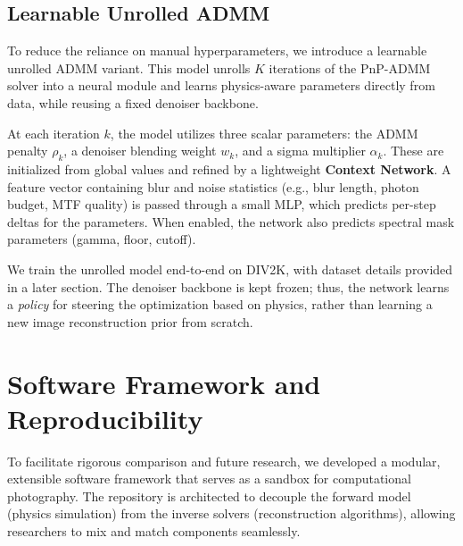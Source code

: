 \documentclass[10pt,journal,compsoc]{IEEEtran}
\begin{document}
\subsection{Learnable Unrolled ADMM}
To reduce the reliance on manual hyperparameters, we introduce a learnable unrolled ADMM variant. This model unrolls $K$ iterations of the PnP-ADMM solver into a neural module and learns physics-aware parameters directly from data, while reusing a fixed denoiser backbone.

At each iteration $k$, the model utilizes three scalar parameters: the ADMM penalty $\rho_k$, a denoiser blending weight $w_k$, and a sigma multiplier $\alpha_k$. These are initialized from global values and refined by a lightweight \textbf{Context Network}. A feature vector containing blur and noise statistics (e.g., blur length, photon budget, MTF quality) is passed through a small MLP, which predicts per-step deltas for the parameters. When enabled, the network also predicts spectral mask parameters (gamma, floor, cutoff).

We train the unrolled model end-to-end on DIV2K, with dataset details provided in a later section. The denoiser backbone is kept frozen; thus, the network learns a \textit{policy} for steering the optimization based on physics, rather than learning a new image reconstruction prior from scratch.

\section{Software Framework and Reproducibility}
To facilitate rigorous comparison and future research, we developed a modular, extensible software framework that serves as a sandbox for computational photography. The repository is architected to decouple the forward model (physics simulation) from the inverse solvers (reconstruction algorithms), allowing researchers to mix and match components seamlessly.
\end{document}
